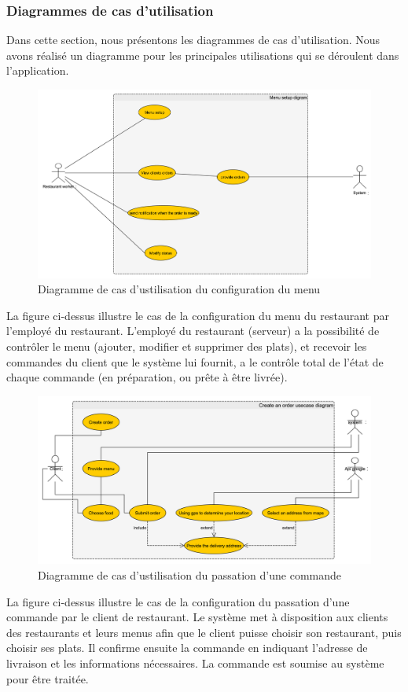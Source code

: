 \documentclass[french, a4paper, 12pt]{report}
\begin{document}
		\newpage
		\subsubsection{Diagrammes de cas d’utilisation} Dans cette section, nous présentons les diagrammes de cas d'utilisation. Nous avons réalisé un diagramme pour les principales utilisations qui se déroulent dans l'application. 
		
		\newpage	
			
			\begin{figure}[!h]
  				\center
  				\includegraphics[width=15cm]{usecasemenu.png}
  				\caption{Diagramme de cas d'ustilisation du configuration du menu}
  				\label{fig:usecasemenu}
			\end{figure}
			
			La figure ci-dessus illustre le cas de la configuration du menu du restaurant par l'employé du restaurant. L'employé du restaurant (serveur) a la possibilité de contrôler
le menu (ajouter, modifier et supprimer des plats), et recevoir les commandes du client que le système lui fournit,
a le contrôle total de l'état de chaque commande (en préparation, ou prête à être livrée).
			
			\newpage
			\begin{figure}[!h]
  				\center
  				\includegraphics[width=15cm]{usecaseorder.png}
  				\caption{Diagramme de cas d'ustilisation du passation d'une commande}
  				\label{fig:usecaseorder}
			\end{figure}
			La figure ci-dessus illustre le cas de la configuration du passation d'une commande par le client de restaurant. Le système met à disposition aux clients des restaurants et leurs menus afin que le client puisse choisir son restaurant,
puis choisir ses plats. Il confirme ensuite la commande en indiquant l'adresse de livraison et les informations nécessaires. La commande est soumise au système pour être traitée.
			
\end{document}
